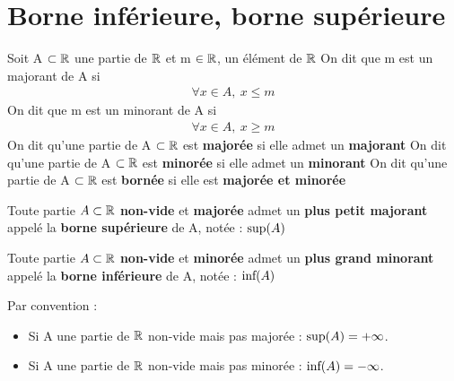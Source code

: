 \section{Borne inférieure, borne supérieure}

Soit A $\subset \mathbb{R}$ une partie de $\mathbb{R}$ et m $\in \mathbb{R}$, un élément de $\mathbb{R}$
\newline
On dit que m est un majorant de A si
\begin{align*}
	\forall x \in A,\ x \leq m
\end{align*}
On dit que m est un minorant de A si
\begin{align*}
	\forall x \in A,\ x \geq m
\end{align*}
\noindent On dit qu'une partie de A $\subset \mathbb{R}$ est \textbf{majorée} si elle admet un \textbf{majorant}
\newline 
On dit qu'une partie de A $\subset \mathbb{R}$ est \textbf{minorée} si elle admet un \textbf{minorant}
\newline 
On dit qu'une partie de A $\subset \mathbb{R}$ est \textbf{bornée} si elle est \textbf{majorée et minorée}
\newline


\begin{graybox}
	\begin{theoreme}
		Toute partie $A \subset \mathbb{R}$ \textbf{non-vide} et \textbf{majorée} admet un \textbf{plus petit majorant} appelé la \textbf{borne supérieure} de A, notée : $\textnormal{sup}(A)$
	\end{theoreme}
\end{graybox}

\begin{graybox}
	\begin{theoreme}
		Toute partie $A \subset \mathbb{R}$ \textbf{non-vide} et \textbf{minorée} admet un \textbf{plus grand minorant} appelé la \textbf{borne inférieure} de A, notée : $\textnormal{inf}(A)$
	\end{theoreme}
\end{graybox}

\begin{graybox}
	\begin{proposition}[]
		Par convention : \\
		\begin{itemize}
			\item Si A une partie de $\mathbb{R}$ non-vide mais pas majorée : $\textnormal{sup}(A) = +\infty$.
			\item Si A une partie de $\mathbb{R}$ non-vide mais pas minorée : $\textnormal{inf}(A) = -\infty$.
		\end{itemize}
	\end{proposition}
\end{graybox}

